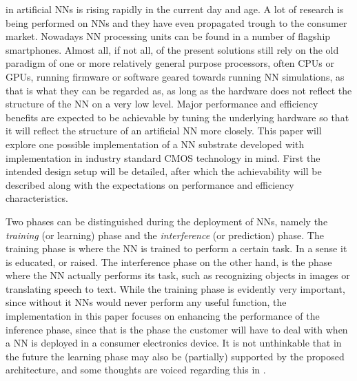 
 in artificial \acp{NN} is rising rapidly in the current day and age. A lot of research is being performed on \acp{NN} and they have even propagated trough to the consumer market. Nowadays \ac{NN} processing units can be found in a number of flagship smartphones. Almost all, if not all, of the present solutions still rely on the old paradigm of one or more relatively general purpose processors, often \acp{CPU} or \acp{GPU}, running firmware or software geared towards running \ac{NN} simulations, as that is what they can be regarded as, as long as the hardware does not reflect the structure of the \ac{NN} on a very low level. Major performance and efficiency benefits are expected to be achievable by tuning the underlying hardware so that it will reflect the structure of an artificial \ac{NN} more closely. This paper will explore one possible implementation of a \ac{NN} substrate developed with implementation in industry standard CMOS technology in mind. First the intended design setup will be detailed, after which the achievability will be described along with the expectations on performance and efficiency characteristics.

Two phases can be distinguished during the deployment of \acp{NN}, namely the \textit{training} (or learning) phase and the \textit{interference} (or prediction) phase\cite{8192463}. The training phase is where the \ac{NN} is trained to perform a certain task. In a sense it is educated, or raised. The interference phase on the other hand, is the phase where the \ac{NN} actually performs its task, such as recognizing objects in images or translating speech to text. While the training phase is evidently very important, since without it \acp{NN} would never perform any useful function, the implementation in this paper focuses on enhancing the performance of the inference phase, since that is the phase the customer will have to deal with when a \ac{NN} is deployed in a consumer electronics device. It is not unthinkable that in the future the learning phase may also be (partially) supported by the proposed architecture, and some thoughts are voiced regarding this in .

